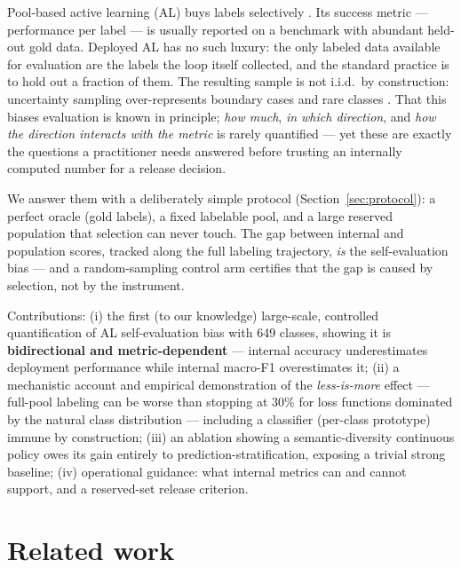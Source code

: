 \documentclass[11pt]{article}
\begin{document}
Pool-based active learning (AL) buys labels selectively
\citep{Settles2012,Lewis1994}. Its success metric --- performance per label
--- is usually reported on a benchmark with abundant held-out gold data.
Deployed AL has no such luxury: the only labeled data available for
evaluation are the labels the loop itself collected, and the standard
practice is to hold out a fraction of them. The resulting sample is not
i.i.d.\ by construction: uncertainty sampling over-represents boundary
cases and rare classes \citep{Attenberg2010,Santos2016Vies}. That this
biases evaluation is known in principle; \emph{how much}, \emph{in which
direction}, and \emph{how the direction interacts with the metric} is
rarely quantified --- yet these are exactly the questions a practitioner
needs answered before trusting an internally computed number for a release
decision.

We answer them with a deliberately simple protocol (Section~\ref{sec:protocol}):
a perfect oracle (gold labels), a fixed labelable pool, and a large
reserved population that selection can never touch. The gap between
internal and population scores, tracked along the full labeling
trajectory, \emph{is} the self-evaluation bias --- and a random-sampling
control arm certifies that the gap is caused by selection, not by the
instrument.

Contributions: (i) the first (to our knowledge) large-scale, controlled
quantification of AL self-evaluation bias with 649 classes, showing it is
\textbf{bidirectional and metric-dependent} --- internal accuracy
underestimates deployment performance while internal macro-F1
overestimates it; (ii) a mechanistic account and empirical demonstration
of the \emph{less-is-more} effect --- full-pool labeling can be worse than
stopping at 30\% for loss functions dominated by the natural class
distribution --- including a classifier (per-class prototype) immune by
construction; (iii) an ablation showing a semantic-diversity continuous
policy owes its gain entirely to prediction-stratification, exposing a
trivial strong baseline; (iv) operational guidance: what internal metrics
can and cannot support, and a reserved-set release criterion.

\section{Related work}
\label{sec:related}
\end{document}
